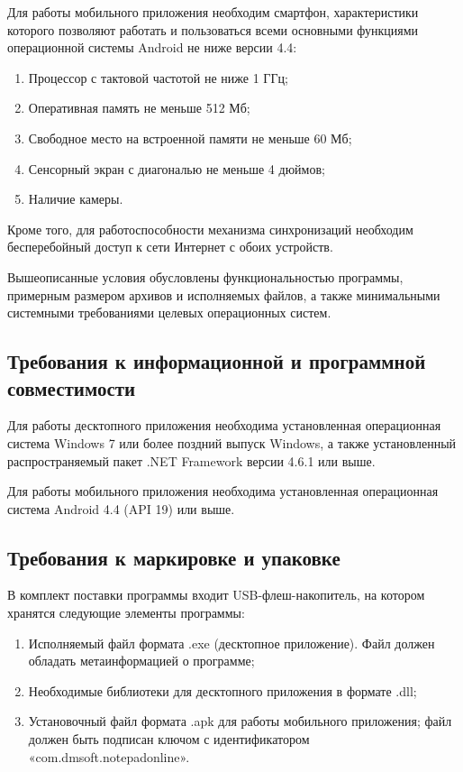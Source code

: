 Для работы мобильного приложения необходим смартфон, характеристики которого позволяют работать и пользоваться всеми основными функциями операционной системы Android не ниже версии 4.4: 

\begin{enumerate}
\item Процессор с тактовой частотой не ниже 1 ГГц;
\item Оперативная память не меньше 512 Мб;
\item Свободное место на встроенной памяти не меньше 60 Мб;
\item Сенсорный экран с диагональю не меньше 4 дюймов;
\item Наличие камеры.
\end{enumerate}

Кроме того, для работоспособности механизма синхронизаций необходим бесперебойный доступ к сети Интернет с обоих устройств.

Вышеописанные условия обусловлены функциональностью программы, примерным размером архивов и исполняемых файлов, а также минимальными системными требованиями целевых операционных систем.

\subsection{Требования к информационной и программной совместимости}
Для работы десктопного приложения необходима установленная операционная система Windows 7 или более поздний выпуск Windows, а также установленный распространяемый пакет .NET Framework версии 4.6.1 или выше.

Для работы мобильного приложения необходима установленная операционная система Android 4.4 (API 19) или выше.

\subsection{Требования к маркировке и упаковке}
В комплект поставки программы входит USB-флеш-накопитель, на котором хранятся следующие элементы программы:

\begin{enumerate}
\item Исполняемый файл формата .exe (десктопное приложение). Файл должен обладать метаинформацией о программе;
\item Необходимые библиотеки для десктопного приложения в формате .dll;
\item Установочный файл формата .apk для работы мобильного приложения; файл должен быть подписан ключом с идентификатором «com.dmsoft.notepadonline».
\end{enumerate}

